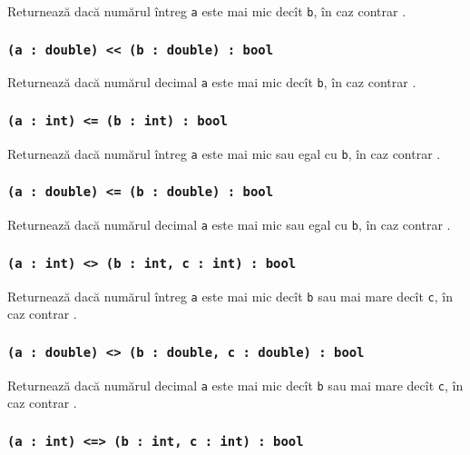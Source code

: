Returnează \true{} dacă numărul întreg \texttt{a} este mai mic decît \texttt{b}, în caz contrar \false{}.

\subsubsection{\texttt{(a : double) << (b : double) : bool}}

Returnează \true{} dacă numărul decimal \texttt{a} este mai mic decît \texttt{b}, în caz contrar \false{}.

\subsubsection{\texttt{(a : int) <= (b : int) : bool}}

Returnează \true{} dacă numărul întreg \texttt{a} este mai mic sau egal cu \texttt{b}, în caz contrar \false{}.

\subsubsection{\texttt{(a : double) <= (b : double) : bool}}

Returnează \true{} dacă numărul decimal \texttt{a} este mai mic sau egal cu \texttt{b}, în caz contrar \false{}.

\subsubsection{\texttt{(a : int) <> (b : int, c : int) : bool}}

Returnează \true{} dacă numărul întreg \texttt{a} este mai mic decît \texttt{b} sau mai mare decît \texttt{c}, în caz contrar \false{}.

\subsubsection{\texttt{(a : double) <> (b : double, c : double) : bool}}

Returnează \true{} dacă numărul decimal \texttt{a} este mai mic decît \texttt{b} sau mai mare decît \texttt{c}, în caz contrar \false{}.

\subsubsection{\texttt{(a : int) <=> (b : int, c : int) : bool}}


